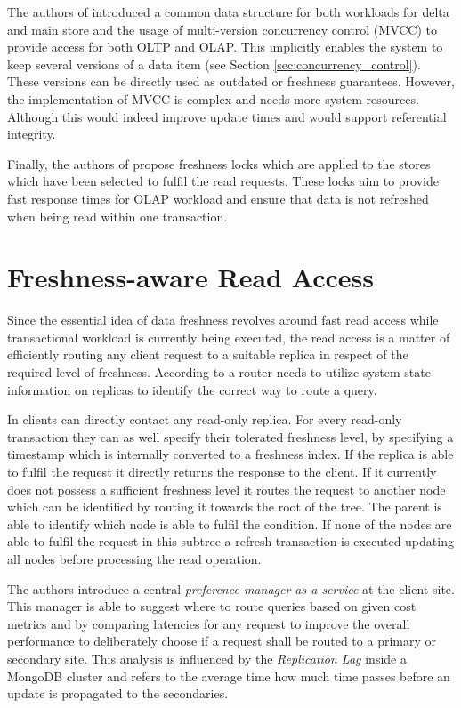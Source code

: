 The authors of \cite{psaroudakis:2015} introduced a common data structure for both workloads for delta and
main store and the usage of multi-version concurrency control (MVCC) to provide access for both OLTP and OLAP.
This implicitly enables the system to keep several versions of a data item (see Section \ref{sec:concurrency_control}).
These versions can be directly used as outdated or freshness guarantees. However, the implementation of MVCC is complex and needs more system resources.
Although this would indeed improve update times and would support referential integrity. 

Finally, the authors of \cite{akal:2005} propose freshness locks which are applied to the stores which have been selected to fulfil the read requests. 
These locks aim to provide fast response times for OLAP workload and ensure that data is not refreshed when being read within one transaction.



\section{Freshness-aware Read Access}
\label{r:read}
Since the essential idea of data freshness revolves around fast read access while transactional workload is currently being executed,
the read access is a matter of efficiently routing any client request to a suitable replica in respect of the required level of freshness.
According to \cite{rohm:2002} a router needs to utilize system state information on replicas to identify the correct way to route a query.

In \cite{voicu:2010} clients can directly contact any read-only replica. For every read-only transaction they can as well specify
their tolerated freshness level, by specifying a timestamp which is internally converted to a freshness index. If the replica is able to fulfil the request 
it directly returns the response to the client. If it currently does not possess a sufficient freshness level it routes the request to another node which can be identified 
by routing it towards the root of the tree. The parent is able to identify which node is able to fulfil the condition.  
If none of the nodes are able to fulfil the request in this subtree a refresh transaction is executed updating all nodes before processing the read operation.

The authors \cite{huang:2020} introduce a central \emph{preference manager as a service} at the client site. This manager is able to suggest where to route queries 
based on given cost metrics and by comparing latencies for any request to improve the overall performance to deliberately choose if a request shall be routed to a 
primary or secondary site. This analysis is influenced by the \emph{Replication Lag} inside a MongoDB cluster and refers to the average time how much time passes 
before an update is propagated to the secondaries. 




